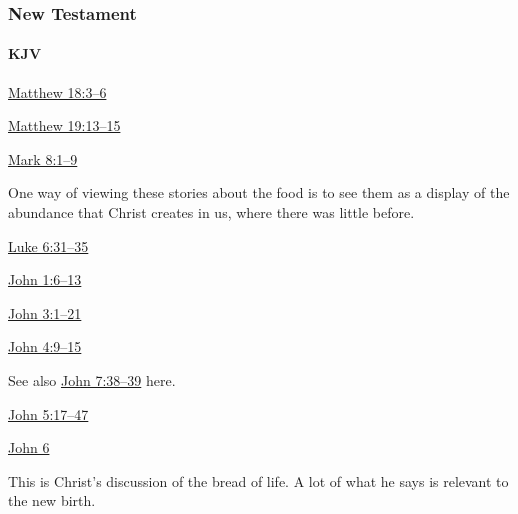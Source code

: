 		
	\subsubsection{New Testament} %
		\label{NEWBIRTH-NT}
	
		\paragraph{KJV}
			\label{NEWBIRTH-NT-KJV}
			
	
			
			\begin{compactdesc}
				\item[{\hyperref[MATTHEW-18-3]{Matthew 18:3--6}}]
				\item[{\hyperref[MATTHEW-19-13]{Matthew 19:13--15}}]
				\item[{\hyperref[MARK-8-1]{Mark 8:1--9}}] \phantom{.}
					\begin{compactitem}
						\item One way of viewing these stories about the food is to see them as a display of the abundance that Christ creates in us, where there was little before.
					\end{compactitem}
				\item[{\hyperref[LUKE-6-31]{Luke 6:31--35}}]
				\item[{\hyperref[JOHN-1-6]{John 1:6--13}}]
				\item[{\hyperref[JOHN-3-1]{John 3:1--21}}]
				\item[{\hyperref[JOHN-4-9]{John 4:9--15}}] \phantom{.}
					\begin{compactitem}
						\item See also \hyperref[JOHN-7-38]{John 7:38--39} here.
					\end{compactitem}
				\item[{\hyperref[JOHN-5-17]{John 5:17--47}}]
				\item[{\hyperref[JOHN-6]{John 6}}] \phantom{.}
					\begin{compactitem}
						\item This is Christ's discussion of the bread of life. A lot of what he says is relevant to the new birth.
					\end{compactitem}

\end{compactdesc}
